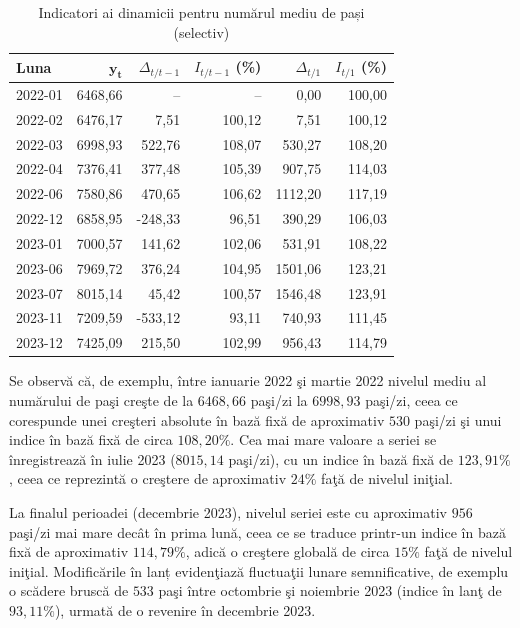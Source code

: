 \documentclass[12pt,a4paper]{report}
\begin{document}
\begin{table}[h!]
    \centering
    \caption{Indicatori ai dinamicii pentru numărul mediu de pași (selectiv)}
    \label{tab:ind-dinamici}
    \begin{tabular}{l r r r r r}
        \hline
        \textbf{Luna} &
        \(\mathbf{y_t}\) &
        \(\Delta_{t/t-1}\) &
        \(I_{t/t-1}\) (\%) &
        \(\Delta_{t/1}\) &
        \(I_{t/1}\) (\%) \\
        \hline
        2022-01 & 6468{,}66 &     --    &     --    &      0{,}00 & 100{,}00 \\
        2022-02 & 6476{,}17 &    7{,}51 & 100{,}12  &      7{,}51 & 100{,}12 \\
        2022-03 & 6998{,}93 &  522{,}76 & 108{,}07  &    530{,}27 & 108{,}20 \\
        2022-04 & 7376{,}41 &  377{,}48 & 105{,}39  &    907{,}75 & 114{,}03 \\
        2022-06 & 7580{,}86 &  470{,}65 & 106{,}62  &   1112{,}20 & 117{,}19 \\
        2022-12 & 6858{,}95 & -248{,}33 &  96{,}51  &    390{,}29 & 106{,}03 \\
        2023-01 & 7000{,}57 &  141{,}62 & 102{,}06  &    531{,}91 & 108{,}22 \\
        2023-06 & 7969{,}72 &  376{,}24 & 104{,}95  &   1501{,}06 & 123{,}21 \\
        2023-07 & 8015{,}14 &   45{,}42 & 100{,}57  &   1546{,}48 & 123{,}91 \\
        2023-11 & 7209{,}59 & -533{,}12 &  93{,}11  &    740{,}93 & 111{,}45 \\
        2023-12 & 7425{,}09 &  215{,}50 & 102{,}99  &    956{,}43 & 114{,}79 \\
        \hline
    \end{tabular}
\end{table}

Se observă că, de exemplu, între ianuarie 2022 şi martie 2022 nivelul mediu al numărului de paşi creşte de la \(6468{,}66\) paşi/zi la \(6998{,}93\) paşi/zi, ceea ce corespunde unei creşteri absolute în bază fixă de aproximativ \(530\) paşi/zi şi unui indice în bază fixă de circa \(108{,}20\%\). Cea mai mare valoare a seriei se înregistrează în iulie 2023 (\(8015{,}14\) paşi/zi), cu un indice în bază fixă de \(123{,}91\%\), ceea ce reprezintă o creştere de aproximativ \(24\%\) faţă de nivelul iniţial.

La finalul perioadei (decembrie 2023), nivelul seriei este cu aproximativ \(956\) paşi/zi mai mare decât în prima lună, ceea ce se traduce printr-un indice în bază fixă de aproximativ \(114{,}79\%\), adică o creştere globală de circa \(15\%\) faţă de nivelul iniţial. Modificările în lanț evidenţiază fluctuaţii lunare semnificative, de exemplu o scădere bruscă de \(533\) paşi între octombrie şi noiembrie 2023 (indice în lanţ de \(93{,}11\%\)), urmată de o revenire în decembrie 2023.
\end{document}
